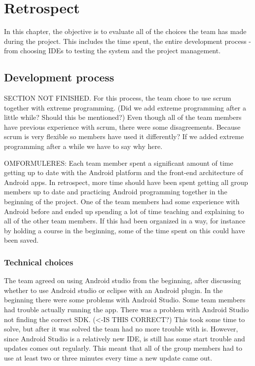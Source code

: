 \chapter{Retrospect}
In this chapter, the objective is to evaluate all of the choices the team has made during the project. This includes the time spent, the entire development process - from choosing IDEs to testing the system and the project management. 







\section{Development process}
SECTION NOT FINISHED. For this process, the team chose to use scrum together with extreme programming. (Did we add extreme programming after a little while? Should this be mentioned?) Even though all of the team members have previous experience with scrum, there were some disagreements. Because scrum is very flexible so members have used it differently? If we added extreme programming after a while we have to say why here. 

OMFORMULERES: Each team member spent a significant amount of time getting up to date with the Android platform and the front-end architecture of Android apps. In retrospect, more time should have been spent getting all group members up to date and practicing Android programming together in the beginning of the project. One of the team members had some experience with Android before and ended up spending a lot of time teaching and explaining to all of the other team members. If this had been organized in a way, for instance by holding a course in the beginning, some of the time spent on this could have been saved. 

\subsection{Technical choices}
The team agreed on using Android studio from the beginning, after discussing whether to use Android studio or eclipse with an Android plugin. In the beginning there were some problems with Android Studio. Some team members had trouble actually running the app. There was a problem with Android Studio not finding the correct SDK. (<-IS THIS CORRECT?) This took some time to solve, but after it was solved the team had no more trouble with is. However, since Android Studio is a relatively new IDE, is still has some start trouble and updates comes out regularly. This meant that all of the group members had to use at least two or three minutes every time a new update came out. 

